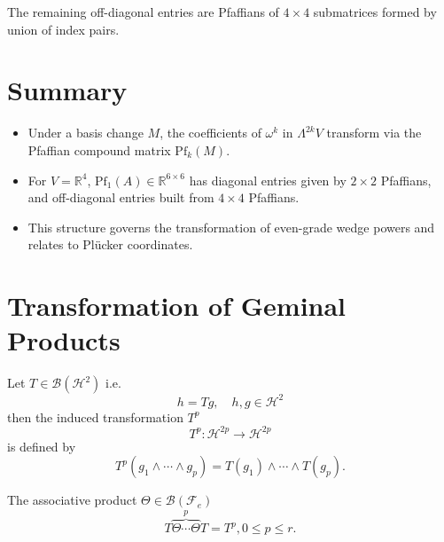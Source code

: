 \documentclass[aps,prd,onecolumn,notitlepage,nofootinbib]{revtex4-2}
\begin{document}
The remaining off-diagonal entries are Pfaffians of $4 \times 4$ submatrices
formed by union of index pairs.

\section*{Summary}

\begin{itemize}
\item Under a basis change $M$, the coefficients of $\omega ^{k}$ in $%
\Lambda ^{2k}V$ transform via the Pfaffian compound matrix $\mathrm{Pf}%
_{k}(M)$.

\item For $V=\mathbb{R}^{4}$, $\mathrm{Pf}_{1}(A)\in \mathbb{R}^{6\times 6}$
has diagonal entries given by $2\times 2$ Pfaffians, and off-diagonal
entries built from $4\times 4$ Pfaffians.

\item This structure governs the transformation of even-grade wedge powers
and relates to Pl\"{u}cker coordinates.
\end{itemize}

\bigskip

\section{Transformation of Geminal Products}

\begin{definition}
Let $T\in \mathcal{B}\left( \mathcal{H}^{2}\right) $ i.e. 
\begin{equation}
h=Tg,\quad h,g\in \mathcal{H}^{2}
\end{equation}%
then the induced transformation $T^{p}$   
\begin{equation}
T^{p}:\mathcal{H}^{2p}\rightarrow \mathcal{H}^{2p}
\end{equation}%
is defined by 
\begin{equation}
T^{p}\left( g_{1}\wedge \cdots \wedge g_{p}\right) =T\left( g_{1}\right)
\wedge \cdots \wedge T\left( g_{p}\right) .
\end{equation}
\end{definition}

\begin{definition}
The associative product $\Theta \in \mathcal{B}\left( \mathcal{F}_{e}\right) 
$ 
\begin{equation}
T\overset{p}{\overbrace{\Theta \cdots \Theta }}T=T^{p},0\leq p\leq r.
\end{equation}
\end{definition}
\end{document}
